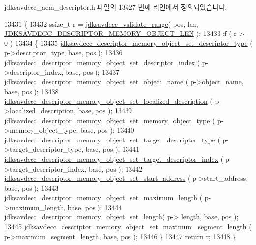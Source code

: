 jdksavdecc\+\_\+aem\+\_\+descriptor.\+h 파일의 13427 번째 라인에서 정의되었습니다.


\begin{DoxyCode}
13431 \{
13432     ssize\_t r = \hyperlink{group__util_ga9c02bdfe76c69163647c3196db7a73a1}{jdksavdecc\_validate\_range}( pos, len, 
      \hyperlink{group__descriptor__memory__object_gad4027419245acec5ed6ac76adda4d015}{JDKSAVDECC\_DESCRIPTOR\_MEMORY\_OBJECT\_LEN} );
13433     \textcolor{keywordflow}{if} ( r >= 0 )
13434     \{
13435         \hyperlink{group__descriptor__memory__object_ga8af0341f923c2b3c33b5d39263ff40d1}{jdksavdecc\_descriptor\_memory\_object\_set\_descriptor\_type}
      ( p->descriptor\_type, base, pos );
13436         \hyperlink{group__descriptor__memory__object_ga4e422f16b4b4e84f1063a7d6dfaa958d}{jdksavdecc\_descriptor\_memory\_object\_set\_descriptor\_index}
      ( p->descriptor\_index, base, pos );
13437         \hyperlink{group__descriptor__memory__object_ga91e90687bb86a44e44ab3ab0ca2238f5}{jdksavdecc\_descriptor\_memory\_object\_set\_object\_name}
      ( p->object\_name, base, pos );
13438         \hyperlink{group__descriptor__memory__object_ga59e06c2369ca02c274e837c84dbe13c0}{jdksavdecc\_descriptor\_memory\_object\_set\_localized\_description}
      ( p->localized\_description, base, pos );
13439         \hyperlink{group__descriptor__memory__object_gae9ccd421c27066b3f53be942176f5f34}{jdksavdecc\_descriptor\_memory\_object\_set\_memory\_object\_type}
      ( p->memory\_object\_type, base, pos );
13440         \hyperlink{group__descriptor__memory__object_ga33a14df7c510d98ccc8871645eecc484}{jdksavdecc\_descriptor\_memory\_object\_set\_target\_descriptor\_type}
      ( p->target\_descriptor\_type, base, pos );
13441         \hyperlink{group__descriptor__memory__object_ga4144e5cb684be55ede23408f10394b96}{jdksavdecc\_descriptor\_memory\_object\_set\_target\_descriptor\_index}
      ( p->target\_descriptor\_index, base, pos );
13442         \hyperlink{group__descriptor__memory__object_ga7c9c1ec01466d6586f71b6a8b0a7d9f8}{jdksavdecc\_descriptor\_memory\_object\_set\_start\_address}
      ( p->start\_address, base, pos );
13443         \hyperlink{group__descriptor__memory__object_ga523584c439c14c9121f4a0411d64b2d5}{jdksavdecc\_descriptor\_memory\_object\_set\_maximum\_length}
      ( p->maximum\_length, base, pos );
13444         \hyperlink{group__descriptor__memory__object_gad149e5768497a72cf665918d1cc1ce38}{jdksavdecc\_descriptor\_memory\_object\_set\_length}( p->
      length, base, pos );
13445         \hyperlink{group__descriptor__memory__object_gae409b24b5b3631caa834820c4558dd34}{jdksavdecc\_descriptor\_memory\_object\_set\_maximum\_segment\_length}
      ( p->maximum\_segment\_length, base, pos );
13446     \}
13447     \textcolor{keywordflow}{return} r;
13448 \}
\end{DoxyCode}



